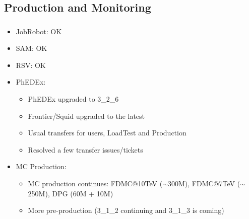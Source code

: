 \documentclass{beamer}
\newcommand{\ca}{\ensuremath{\sim}}
\begin{document}
\subsection{Production and Monitoring}
\begin{frame}
\frametitle{}
\begin{itemize}
	\item JobRobot: OK
	\item SAM: OK
	\item RSV: OK
	\item PhEDEx:
	\begin{itemize}
		\item PhEDEx upgraded to 3\_2\_6
		\item Frontier/Squid upgraded to the latest
		\item Usual transfers for users, LoadTest and Production
		\item Resolved a few transfer issues/tickets
	\end{itemize}
	\item MC Production:
	\begin{itemize}
		\item MC production continues: FDMC@10TeV (\ca{}300M), FDMC@7TeV (\ca{}250M), DPG (60M + 10M)
		\item More pre-production (3\_1\_2 continuing and 3\_1\_3 is coming)
	\end{itemize}
\end{itemize}
\end{frame}
\end{document}
